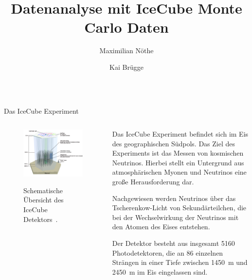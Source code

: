 \documentclass[t]{beamer}
\title{Datenanalyse mit IceCube Monte Carlo Daten}
\author{Maximilian Nöthe \and Kai Brügge}
\institute{%
  \texttt{[image: tudo.pdf]}%
}
\begin{document}
  \begin{columns}[onlytextwidth]%
    \begin{column}{0.5\textwidth}%
      \begin{block}{Das IceCube Experiment}%
        \begin{columns}[onlytextwidth]%
          \begin{column}{0.48\textwidth}%
            \begin{figure}
              \includegraphics[width=\linewidth]{images/icecube_schema.jpg}\\
              \caption{Schematische Übersicht des IceCube Detektors~\cite{icecube_pic}.}
            \end{figure}
          \end{column}\hfill
          \begin{column}{0.48\textwidth}%
            \justifying
            Das IceCube Experiment befindet sich im Eis des geographischen Südpols.
            Das Ziel des Experiments ist das Messen von kosmischen Neutrinos.
            Hierbei stellt ein Untergrund aus atmosphärischen Myonen und Neutrinos eine
            große Herausforderung dar.

            Nachgewiesen werden Neutrinos über das Tscherenkow-Licht von Sekundärteilchen,
            die bei der Wechselwirkung der Neutrinos mit den Atomen des Eises entstehen.

            Der Detektor besteht aus insgesamt \num{5160} Photodetektoren,
            die an \num{86} einzelnen Strängen in einer Tiefe zwischen
            \SI{1450}{\meter} und \SI{2450}{\meter} im Eis eingelassen sind.


\end{column}
\end{columns}
\end{block}
\end{column}
\end{columns}
\end{document}
